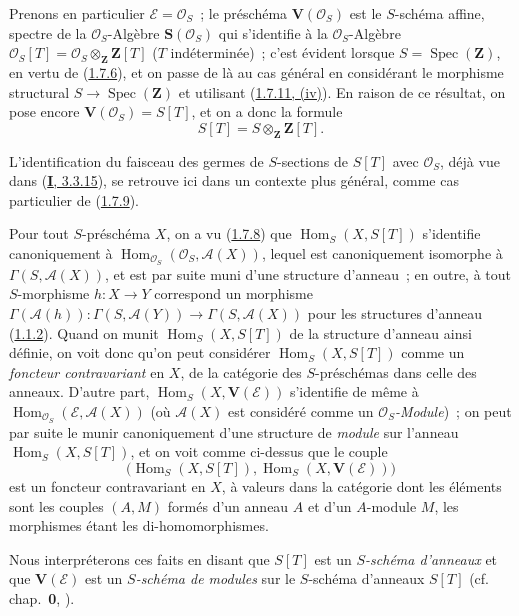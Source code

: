 \begin{env}[1.7.12]
\label{II.1.7.12-fr}
Prenons en particulier $\mathcal{E}=\mathcal{O}_S$~; le préschéma
$\mathbf{V}(\mathcal{O}_S)$ est le $S$-schéma affine, spectre de la
$\mathcal{O}_S$-Algèbre $\mathbf{S}(\mathcal{O}_S)$ qui s'identifie à la
$\mathcal{O}_S$-Algèbre
$\mathcal{O}_S[T]=\mathcal{O}_S\otimes_{\mathbf{Z}}\mathbf{Z}[T]$
($T$ indéterminée)~; c'est évident lorsque
$S=\operatorname{Spec}(\mathbf{Z})$, en vertu de
(\hyperref[II.1.7.6-fr]{1.7.6}), et on passe de là au cas général en
considérant le morphisme structural
$S\to\operatorname{Spec}(\mathbf{Z})$ et utilisant
(\hyperref[II.1.7.11-fr]{1.7.11, (iv)}). En raison de ce résultat, on pose
encore $\mathbf{V}(\mathcal{O}_S)=S[T]$, et on a donc la formule
\[
  S[T]=S\otimes_{\mathbf{Z}}\mathbf{Z}[T].
  \tag{1.7.12.1}\label{II.1.7.12.1-fr}
\]

L'identification du faisceau des germes de $S$-sections de $S[T]$ avec
$\mathcal{O}_S$, déjà vue dans
(\hyperref[I.3.3.15-fr]{\textbf{I}, 3.3.15}), se retrouve ici dans un contexte plus
général, comme cas particulier de (\hyperref[II.1.7.9-fr]{1.7.9}).
\end{env}

\begin{env}[1.7.13]
\label{II.1.7.13-fr}
Pour tout $S$-préschéma $X$, on a vu
(\hyperref[II.1.7.8-fr]{1.7.8}) que
$\operatorname{Hom}_S(X,S[T])$ s'identifie canoniquement à
$\operatorname{Hom}_{\mathcal{O}_S}(\mathcal{O}_S,\mathcal{A}(X))$, lequel
est canoniquement isomorphe à $\Gamma(S,\mathcal{A}(X))$, et est par suite
muni d'une structure d'anneau~; en outre, à tout $S$-morphisme $h:X\to Y$
correspond un morphisme
$\Gamma(\mathcal{A}(h)):\Gamma(S,\mathcal{A}(Y))
\to\Gamma(S,\mathcal{A}(X))$ pour les structures d'anneau
(\hyperref[II.1.1.2-fr]{1.1.2}). Quand on munit
$\operatorname{Hom}_S(X,S[T])$ de la structure d'anneau ainsi définie, on
voit donc qu'on peut considérer $\operatorname{Hom}_S(X,S[T])$ comme un
\emph{foncteur contravariant} en $X$, de la catégorie des $S$-préschémas
dans celle des anneaux. D'autre part,
$\operatorname{Hom}_S(X,\mathbf{V}(\mathcal{E}))$ s'identifie de même à
$\operatorname{Hom}_{\mathcal{O}_S}(\mathcal{E},\mathcal{A}(X))$ (où
$\mathcal{A}(X)$ est considéré comme un
\emph{$\mathcal{O}_S$-Module})~; on peut par suite le munir canoniquement
d'une structure de \emph{module} sur l'anneau
$\operatorname{Hom}_S(X,S[T])$, et on voit comme ci-dessus que le couple
\[
  \bigl(\operatorname{Hom}_S(X,S[T]),
  \operatorname{Hom}_S(X,\mathbf{V}(\mathcal{E}))\bigr)
\]
est un foncteur contravariant en $X$, à valeurs dans la catégorie dont les
éléments sont les couples $(A,M)$ formés d'un anneau $A$ et d'un $A$-module
$M$, les morphismes étant les di-homomorphismes.

Nous interpréterons ces faits en disant que $S[T]$ est un
\emph{$S$-schéma d'anneaux} et que $\mathbf{V}(\mathcal{E})$ est un
\emph{$S$-schéma de modules} sur le $S$-schéma d'anneaux $S[T]$
(cf. chap.~\textbf{0}, ).
\end{env}


